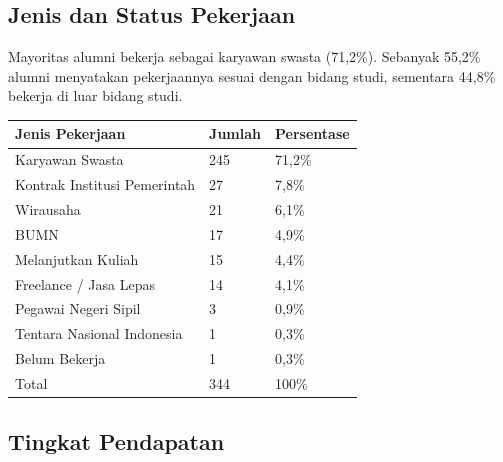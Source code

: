 \subsection{Jenis dan Status Pekerjaan}

Mayoritas alumni bekerja sebagai karyawan swasta (71,2\%). Sebanyak 55,2\% alumni menyatakan pekerjaannya sesuai dengan bidang studi, sementara 44,8\% bekerja di luar bidang studi.

\begin{center}
\end{center}

\begin{center}
\begin{tabular}{L{9cm}C{2cm}C{2.5cm}}
\toprule
Jenis Pekerjaan & Jumlah & Persentase \\
\midrule
Karyawan Swasta & 245 & 71,2\% \\
Kontrak Institusi Pemerintah & 27 & 7,8\% \\
Wirausaha & 21 & 6,1\% \\
BUMN & 17 & 4,9\% \\
Melanjutkan Kuliah & 15 & 4,4\% \\
Freelance / Jasa Lepas & 14 & 4,1\% \\
Pegawai Negeri Sipil & 3 & 0,9\% \\
Tentara Nasional Indonesia & 1 & 0,3\% \\
Belum Bekerja & 1 & 0,3\% \\
\midrule
Total & 344 & 100\% \\
\bottomrule
\end{tabular}
\end{center}

\subsection{Tingkat Pendapatan}

